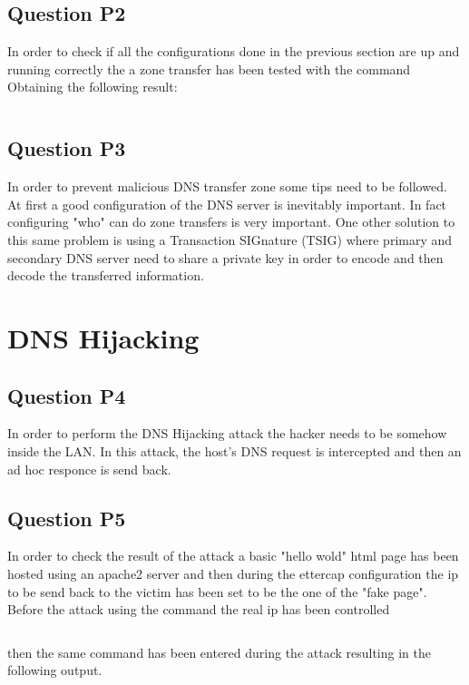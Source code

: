 \inputminted{text}{rndc_status.txt}
\label{conf:rndc_status}

\subsection{Question P2}
In order to check if all the configurations done in the previous section are up and running correctly the a zone transfer has been tested with the command  Obtaining the following result:

\inputminted{text}{zone_transfer.txt}
\label{conf:zone_transfer}

\subsection{Question P3}
In order to prevent malicious DNS transfer zone some tips need to be followed. At first a good configuration of the DNS server is inevitably important. In fact configuring "who" can do zone transfers is very important. One other solution to this same problem is using a Transaction SIGnature (TSIG) where primary and secondary DNS server need to share a private key in order to encode and then decode the transferred information.

\section{DNS Hijacking}

\subsection{Question P4}
In order to perform the DNS Hijacking attack the hacker needs to be somehow inside the LAN. In this attack, the host's DNS request is intercepted and then an ad hoc responce is send back.

\subsection{Question P5}
In order to check the result of the attack a basic "hello wold" html page has been hosted using an apache2 server and then during the ettercap configuration the ip to be send back to the victim has been set to be the one of the "fake page".
Before the attack using the command  the real ip has been controlled

\inputminted{text}{pre_hijacking.txt}
\label{conf:pre_hijacking}
then the same command has been entered during the attack resulting in the following output.


